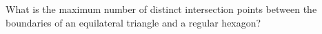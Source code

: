 What is the maximum number of distinct intersection points between the boundaries of an equilateral triangle and a regular hexagon?
